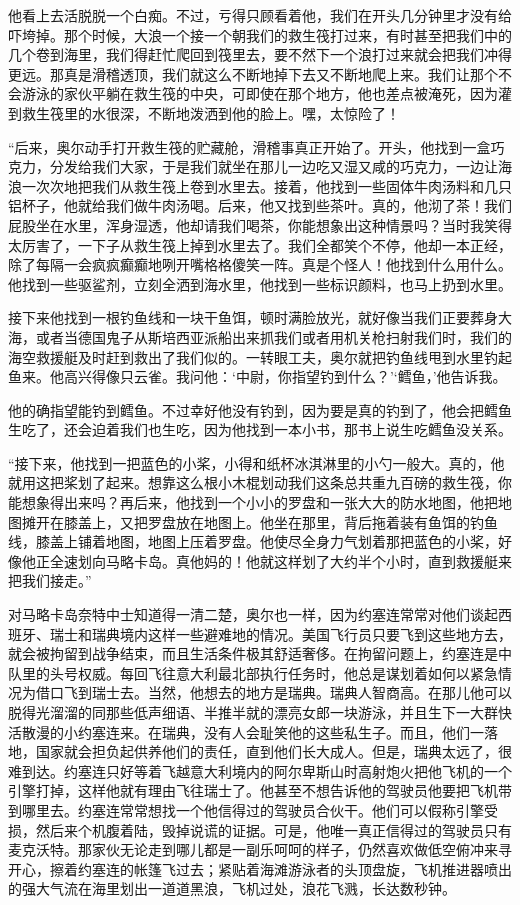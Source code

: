    他看上去活脱脱一个白痴。不过，亏得只顾看着他，我们在开头几分钟里才没有给吓垮掉。那个时候，大浪一个接一个朝我们的救生筏打过来，有时甚至把我们中的几个卷到海里，我们得赶忙爬回到筏里去，要不然下一个浪打过来就会把我们冲得更远。那真是滑稽透顶，我们就这么不断地掉下去又不断地爬上来。我们让那个不会游泳的家伙平躺在救生筏的中央，可即使在那个地方，他也差点被淹死，因为灌到救生筏里的水很深，不断地泼洒到他的脸上。嘿，太惊险了！

    “后来，奥尔动手打开救生筏的贮藏舱，滑稽事真正开始了。开头，他找到一盒巧克力，分发给我们大家，于是我们就坐在那儿一边吃又湿又咸的巧克力，一边让海浪一次次地把我们从救生筏上卷到水里去。接着，他找到一些固体牛肉汤料和几只铝杯子，他就给我们做牛肉汤喝。后来，他又找到些茶叶。真的，他沏了茶！我们屁股坐在水里，浑身湿透，他却请我们喝茶，你能想象出这种情景吗？当时我笑得太厉害了，一下子从救生筏上掉到水里去了。我们全都笑个不停，他却一本正经，除了每隔一会疯疯癫癫地咧开嘴格格傻笑一阵。真是个怪人！他找到什么用什么。他找到一些驱鲨剂，立刻全洒到海水里，他找到一些标识颜料，也马上扔到水里。

 


    接下来他找到一根钓鱼线和一块干鱼饵，顿时满脸放光，就好像当我们正要葬身大海，或者当德国鬼子从斯培西亚派船出来抓我们或者用机关枪扫射我们时，我们的海空救援艇及时赶到救出了我们似的。一转眼工夫，奥尔就把钓鱼线甩到水里钓起鱼来。他高兴得像只云雀。我问他：‘中尉，你指望钓到什么？’‘鳕鱼，’他告诉我。

    他的确指望能钓到鳕鱼。不过幸好他没有钓到，因为要是真的钓到了，他会把鳕鱼生吃了，还会迫着我们也生吃，因为他找到一本小书，那书上说生吃鳕鱼没关系。

    “接下来，他找到一把蓝色的小桨，小得和纸杯冰淇淋里的小勺一般大。真的，他就用这把桨划了起来。想靠这么根小木棍划动我们这条总共重九百磅的救生筏，你能想象得出来吗？再后来，他找到一个小小的罗盘和一张大大的防水地图，他把地图摊开在膝盖上，又把罗盘放在地图上。他坐在那里，背后拖着装有鱼饵的钓鱼线，膝盖上铺着地图，地图上压着罗盘。他使尽全身力气划着那把蓝色的小桨，好像他正全速划向马略卡岛。真他妈的！他就这样划了大约半个小时，直到救援艇来把我们接走。”

    对马略卡岛奈特中士知道得一清二楚，奥尔也一样，因为约塞连常常对他们谈起西班牙、瑞士和瑞典境内这样一些避难地的情况。美国飞行员只要飞到这些地方去，就会被拘留到战争结束，而且生活条件极其舒适奢侈。在拘留问题上，约塞连是中队里的头号权威。每回飞往意大利最北部执行任务时，他总是谋划着如何以紧急情况为借口飞到瑞士去。当然，他想去的地方是瑞典。瑞典人智商高。在那儿他可以脱得光溜溜的同那些低声细语、半推半就的漂亮女郎一块游泳，并且生下一大群快活散漫的小约塞连来。在瑞典，没有人会耻笑他的这些私生子。而且，他们一落地，国家就会担负起供养他们的责任，直到他们长大成人。但是，瑞典太远了，很难到达。约塞连只好等着飞越意大利境内的阿尔卑斯山时高射炮火把他飞机的一个引擎打掉，这样他就有理由飞往瑞士了。他甚至不想告诉他的驾驶员他要把飞机带到哪里去。约塞连常常想找一个他信得过的驾驶员合伙干。他们可以假称引擎受损，然后来个机腹着陆，毁掉说谎的证据。可是，他唯一真正信得过的驾驶员只有麦克沃特。那家伙无论走到哪儿都是一副乐呵呵的样子，仍然喜欢做低空俯冲来寻开心，擦着约塞连的帐篷飞过去；紧贴着海滩游泳者的头顶盘旋，飞机推进器喷出的强大气流在海里划出一道道黑浪，飞机过处，浪花飞溅，长达数秒钟。
 


